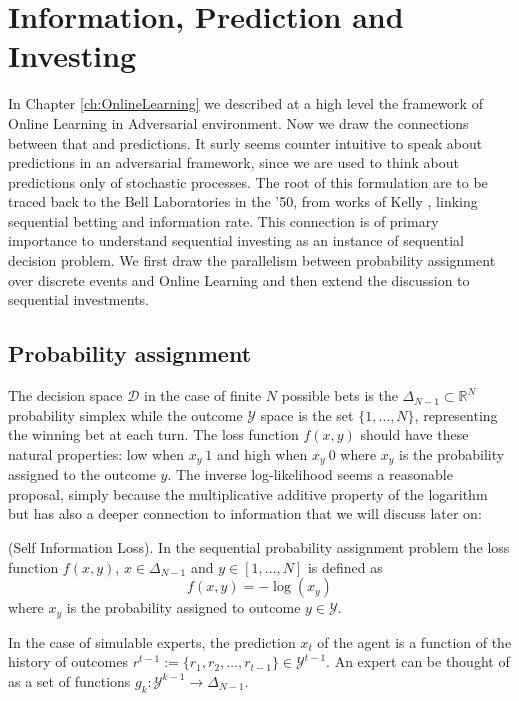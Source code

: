 \chapter{Information, Prediction and Investing}

In Chapter \ref{ch:OnlineLearning} we described at a high level the framework of Online Learning in Adversarial environment. Now we draw the connections between that and predictions. It surly seems counter intuitive to speak about predictions in an adversarial framework, since we are used to think about predictions only of stochastic processes. The root of this formulation are to be traced back to the Bell Laboratories in the '50, from works of Kelly \cite{kelly2011new}, linking sequential betting and information rate. This connection is of primary importance to understand sequential investing as an instance of sequential decision problem.
We first draw the parallelism between probability assignment over discrete events and Online Learning and then extend the discussion to sequential investments.

\section{Probability assignment}
The decision space $\mathcal D$ in the case of finite $N$ possible bets is the $\Delta_{N-1}\subset \mathbb R^{N}$ probability simplex while the outcome $\mathcal Y$ space is the set $\{1,\ldots,N\}$, representing the winning bet at each turn. The loss function $f(x,y)$ should have these natural properties: low when $x_y~1$ and high when $x_y~0$ where $x_y$ is the probability assigned to the outcome $y$. The inverse log-likelihood seems a reasonable proposal, simply because the multiplicative additive property of the logarithm but has also a deeper connection to information that we will discuss later on:

\begin{definition}(Self Information Loss).
    In the sequential probability assignment problem the loss function $f(x,y)$, $x\in \Delta_{N-1}$ and $y\in[1,\ldots,N]$ is defined as
    $$f(x,y)=-\log(x_y)$$
where $x_y$ is the probability assigned to outcome $y\in\mathcal Y$.
\end{definition}

In the case of simulable experts, the prediction $x_t$ of the agent is a function of the history of outcomes $r^{t-1}:=\{r_1,r_2,\ldots,r_{t-1}\}\in\mathcal Y^{t-1}$. An expert can be thought of as a set of functions $g_k:\mathcal Y^{k-1}\to\Delta_{N-1}$.



